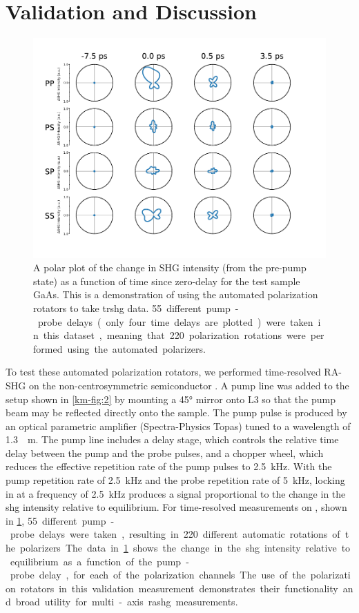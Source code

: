 \section{Validation and Discussion}
\label{km-sec:disc}
\begin{figure}
\centering
\includegraphics[width=\textwidth]{gfx/ch4/km-fig5.pdf}
\caption[Demonstration of the automatic polarization rotators]{A polar plot of the change in SHG intensity (from the pre-pump state) as a function of time since zero-delay for the test sample GaAs.
This is a demonstration of using the automated polarization rotators to take \gls{trshg} data.
\qty{55} different pump-probe delays (only four time delays are plotted) were taken in this dataset, meaning that \qty{220} polarization rotations were performed using the automated polarizers.}
\label{km-fig:4}
\end{figure}

To test these automated polarization rotators, we performed time-resolved RA-SHG on the non-centrosymmetric semiconductor  \citep{Ducuing1963ObservationCrystals, Torchinsky2014ASymmetries}. 
A pump line was added to the setup shown in \cref{km-fig:2} by mounting a \ang{45} mirror onto L3 so that the pump beam may be reflected directly onto the sample. 
The pump pulse is produced by an optical parametric amplifier (Spectra-Physics Topas) tuned to a wavelength of \qty{1.3}{\mu m}.
The pump line includes a delay stage, which controls the relative time delay between the pump and the probe pulses, and a chopper wheel, which reduces the effective repetition rate of the pump pulses to \qty{2.5}{kHz}. 
With the pump repetition rate of \qty{2.5}{kHz} and the probe repetition rate of \qty{5}{kHz}, locking in at a frequency of \qty{2.5}{kHz} produces a signal proportional to the change in the \gls{shg} intensity relative to equilibrium.
For time-resolved measurements on , shown in \cref{km-fig:4}, \qty{55} different pump-probe delays were taken, resulting in \qty{220} different automatic rotations of the polarizers.
The data in \cref{km-fig:4} shows the change in the \gls{shg} intensity relative to equilibrium as a function of the pump-probe delay, for each of the polarization channels. 
The use of the polarization rotators in this validation measurement demonstrates their functionality and broad utility for multi-axis \gls{rashg} measurements.

